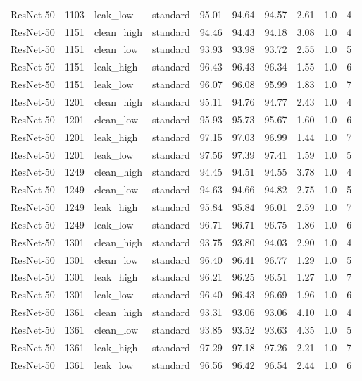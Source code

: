 {\begin{longtable}{lrllrrrrrr}
ResNet-50 & 1103 & leak\_low & standard & 95.01 & 94.64 & 94.57 & 2.61 & 1.0 & 4 \\
ResNet-50 & 1151 & clean\_high & standard & 94.46 & 94.43 & 94.18 & 3.08 & 1.0 & 4 \\
ResNet-50 & 1151 & clean\_low & standard & 93.93 & 93.98 & 93.72 & 2.55 & 1.0 & 5 \\
ResNet-50 & 1151 & leak\_high & standard & 96.43 & 96.43 & 96.34 & 1.55 & 1.0 & 6 \\
ResNet-50 & 1151 & leak\_low & standard & 96.07 & 96.08 & 95.99 & 1.83 & 1.0 & 7 \\
ResNet-50 & 1201 & clean\_high & standard & 95.11 & 94.76 & 94.77 & 2.43 & 1.0 & 4 \\
ResNet-50 & 1201 & clean\_low & standard & 95.93 & 95.73 & 95.67 & 1.60 & 1.0 & 6 \\
ResNet-50 & 1201 & leak\_high & standard & 97.15 & 97.03 & 96.99 & 1.44 & 1.0 & 7 \\
ResNet-50 & 1201 & leak\_low & standard & 97.56 & 97.39 & 97.41 & 1.59 & 1.0 & 5 \\
ResNet-50 & 1249 & clean\_high & standard & 94.45 & 94.51 & 94.55 & 3.78 & 1.0 & 4 \\
ResNet-50 & 1249 & clean\_low & standard & 94.63 & 94.66 & 94.82 & 2.75 & 1.0 & 5 \\
ResNet-50 & 1249 & leak\_high & standard & 95.84 & 95.84 & 96.01 & 2.59 & 1.0 & 7 \\
ResNet-50 & 1249 & leak\_low & standard & 96.71 & 96.71 & 96.75 & 1.86 & 1.0 & 6 \\
ResNet-50 & 1301 & clean\_high & standard & 93.75 & 93.80 & 94.03 & 2.90 & 1.0 & 4 \\
ResNet-50 & 1301 & clean\_low & standard & 96.40 & 96.41 & 96.77 & 1.29 & 1.0 & 5 \\
ResNet-50 & 1301 & leak\_high & standard & 96.21 & 96.25 & 96.51 & 1.27 & 1.0 & 7 \\
ResNet-50 & 1301 & leak\_low & standard & 96.40 & 96.43 & 96.69 & 1.96 & 1.0 & 6 \\
ResNet-50 & 1361 & clean\_high & standard & 93.31 & 93.06 & 93.06 & 4.10 & 1.0 & 4 \\
ResNet-50 & 1361 & clean\_low & standard & 93.85 & 93.52 & 93.63 & 4.35 & 1.0 & 5 \\
ResNet-50 & 1361 & leak\_high & standard & 97.29 & 97.18 & 97.26 & 2.21 & 1.0 & 7 \\
ResNet-50 & 1361 & leak\_low & standard & 96.56 & 96.42 & 96.54 & 2.44 & 1.0 & 6 \\

\end{longtable}}
